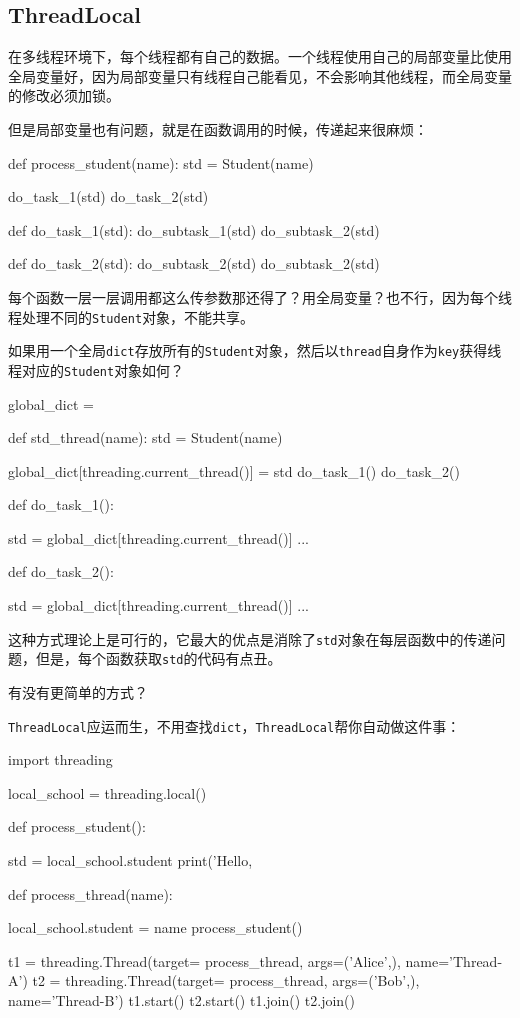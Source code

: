 \hypertarget{threadlocal}{%
\subsection{ThreadLocal}\label{threadlocal}}

在多线程环境下，每个线程都有自己的数据。一个线程使用自己的局部变量比使用全局变量好，因为局部变量只有线程自己能看见，不会影响其他线程，而全局变量的修改必须加锁。

但是局部变量也有问题，就是在函数调用的时候，传递起来很麻烦：

\begin{pythoncode}
def process_student(name):
    std = Student(name)
    
    do_task_1(std)
    do_task_2(std)

def do_task_1(std):
    do_subtask_1(std)
    do_subtask_2(std)

def do_task_2(std):
    do_subtask_2(std)
    do_subtask_2(std)
\end{pythoncode}

每个函数一层一层调用都这么传参数那还得了？用全局变量？也不行，因为每个线程处理不同的\texttt{Student}对象，不能共享。

如果用一个全局\texttt{dict}存放所有的\texttt{Student}对象，然后以\texttt{thread}自身作为\texttt{key}获得线程对应的\texttt{Student}对象如何？

\begin{pythoncode}
global_dict = {}

def std_thread(name):
    std = Student(name)
    
    global_dict[threading.current_thread()] = std
    do_task_1()
    do_task_2()

def do_task_1():
    
    std = global_dict[threading.current_thread()]
    ...

def do_task_2():
    
    std = global_dict[threading.current_thread()]
    ...
\end{pythoncode}

这种方式理论上是可行的，它最大的优点是消除了\texttt{std}对象在每层函数中的传递问题，但是，每个函数获取\texttt{std}的代码有点丑。

有没有更简单的方式？

\texttt{ThreadLocal}应运而生，不用查找\texttt{dict}，\texttt{ThreadLocal}帮你自动做这件事：

\begin{pythoncode}
import threading
    

local_school = threading.local()

def process_student():
    
    std = local_school.student
    print('Hello, %

def process_thread(name):
    
    local_school.student = name
    process_student()

t1 = threading.Thread(target= process_thread, args=('Alice',), name='Thread-A')
t2 = threading.Thread(target= process_thread, args=('Bob',), name='Thread-B')
t1.start()
t2.start()
t1.join()
t2.join()
\end{pythoncode}

